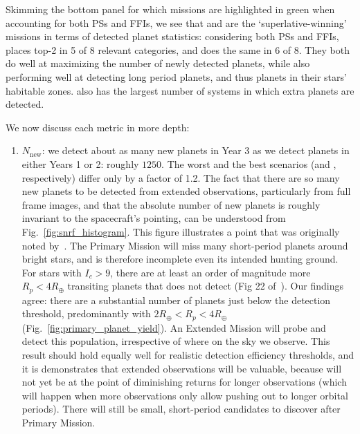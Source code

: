 Skimming the bottom panel for which missions are highlighted in green when accounting for both PSs and FFIs, we see that \npole\:and \hemis\:are the `superlative-winning' missions in terms of detected planet statistics: considering both PSs and FFIs, \npole\:places top-2 in 5 of 8 relevant categories, and \hemis\:does the same in 6 of 8.
They both do well at maximizing the number of newly detected planets, while also performing well at detecting long period planets, and thus planets in their stars' habitable zones.
\hemis\:also has the largest number of systems in which extra planets are detected.

We now discuss each metric in more depth:
\begin{enumerate}
	\item $N_\mathrm{new}$: we detect about as many new planets in Year 3 as we detect planets in either Years 1 or 2: roughly $1250$.
	The worst and the best scenarios (\elong\:and \hemis, respectively) differ only by a factor of 1.2.
	The fact that there are so many new planets to be detected from extended observations, particularly from full frame images, and that the absolute number of new planets is roughly invariant to the spacecraft's pointing, can be understood from Fig.~\ref{fig:snrf_histogram}.
	This figure illustrates a point that was originally noted by~.
        The \tesss Primary Mission will miss many short-period planets around bright stars, and is therefore
        incomplete even its intended hunting ground.
        For stars with $I_c>9$, there are at least an order of magnitude more $R_p<4R_\oplus$ transiting planets that \tess does not detect (Fig 22 of~).
	Our findings agree: there are a substantial number of planets just below the detection threshold, predominantly with $2R_\oplus < R_p <4R_\oplus$ (Fig.~\ref{fig:primary_planet_yield}).
	An Extended Mission will probe and detect this population, irrespective of where on the sky we observe.
	This result should hold equally well for realistic detection efficiency thresholds, and it is demonstrates that extended observations will be valuable, because \tess will not yet be at the point of diminishing returns for longer observations (which will happen when more observations only allow pushing out to longer orbital periods). 
	There will still be small, short-period candidates to discover after \tesss Primary Mission.
\begin{figure}[!t]
	\centering

\end{figure}
\end{enumerate}
